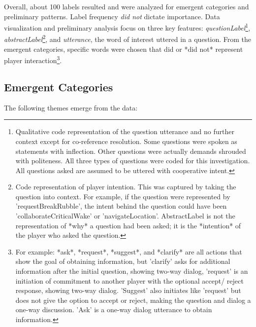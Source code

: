 Overall, about 100 labels resulted and were analyzed for
emergent categories and preliminary patterns. Label frequency \textit{did not}
dictate importance. Data visualization and preliminary analysis focus on three
key features: \textit{questionLabel}\footnote{Qualitative code representation of the
question utterance and no further context except for co-reference resolution.
Some questions were spoken as statements with inflection. Other questions were
actually demands shrouded with politeness. All three types of questions were
coded for this investigation. All questions asked are assumed to be uttered
with cooperative intent.}, \textit{abstractLabel}\footnote{Code representation of
player intention. This was captured by taking the question into context. For
example, if the question were represented by 'requestBreakRubble', the intent
behind the question could have been 'collaborateCriticalWake' or
'navigateLocation'. AbstractLabel is not the representation of *why* a
question had been asked; it is the *intention* of the player who asked the
question.}, and \textit{utterance}, the word of interest uttered in a question. From
the emergent categories, specific words were chosen that did or *did not*
represent player interaction\footnote{For example: *ask*, *request*,
*suggest*, and *clarify* are all actions that show the goal of
obtaining information, but 'clarify' asks for additional information after the
initial question, showing two-way dialog, 'request' is an initiation of
commitment to another player with the optional accept/ reject response, showing
two-way dialog. 'Suggest' also initiates like 'request' but does not give the
option to accept or reject, making the question and dialog a one-way
discussion. 'Ask' is a one-way dialog utterance to obtain information.}. 


\subsection{Emergent Categories}


The following themes emerge from the data:

